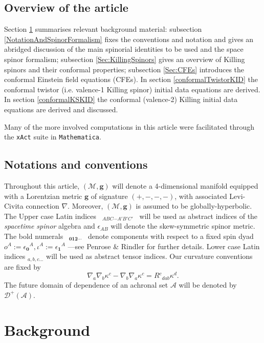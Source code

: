 \documentclass[10pt,a4paper]{article}
\theoremstyle{plain}
\def\bmg{{\bm g}}
\begin{document}
\subsection*{Overview of the article}
  Section \ref{Background} summarises relevant background material:
  subsection \ref{NotationAndSpinorFormalism} fixes the conventions
  and notation and gives an abridged discussion of the main spinorial
  identities to be used and the space spinor formalism; subsection
  \ref{Sec:KillingSpinors} gives an overview of Killing spinors and
  their conformal properties; subsection \ref{Sec:CFEs} introduces the conformal
  Einstein field equations (CFEs).  In section
  \ref{conformalTwistorKID} the conformal
  twistor (i.e. valence-1 Killing spinor) initial data equations are derived. In section \ref{conformalKSKID} the conformal (valence-2) Killing initial data
  equations are derived and discussed.
  
  \medskip 
  
  Many of the more involved computations in this article were
facilitated through the {\tt xAct} suite in {\tt Mathematica}.



\subsection*{Notations and conventions}

Throughout this article, $(\mathcal{M}, \bmg)$ will denote a
4-dimensional manifold equipped with a Lorentzian metric $\bmg$ of
signature $(+, -, -, -)$, with associated Levi-Civita connection
$\nabla$.  Moreover, $(\mathcal{M}, \bmg)$ is assumed to be
globally-hyperbolic. The Upper case Latin indices ~$_{ABC\cdots
  A'B'C'}$~ will be used as abstract indices of the \emph{spacetime
spinor} algebra and $\epsilon_{AB}$ will denote the skew-symmetric spinor metric. The bold numerals ~$_{\bm0\bm1\bm2\cdots}$~
denote components with respect to a fixed spin dyad $ o^A:=
\epsilon_{\bm0}{}^A,\iota^A:=\epsilon_{\bm1}{}^A $ ---see Penrose \&
Rindler \cite{PenRin84} for further details.  Lower case Latin indices
$_{a,b,c...}$ will be used as abstract tensor indices. Our curvature conventions are fixed by
\[\nabla_{a}\nabla_{b}\kappa^c-\nabla_{b}\nabla_{a}\kappa^c=R{}^{c}{}_{dab}\kappa^{d}.\]
The future domain of dependence of an achronal set $\mathcal{A}$ will
be denoted by $\mathcal{D}^{+}(\mathcal{A})$.


\section{Background}
\label{Background}
\end{document}
